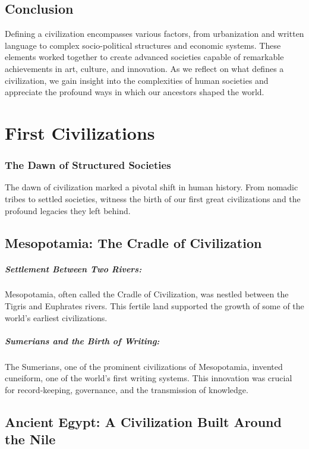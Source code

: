 \documentclass[a4paper,12pt]{book}
\begin{document}
\section*{Conclusion}

Defining a civilization encompasses various factors, from urbanization and written language to complex socio-political structures and economic systems. These elements worked together to create advanced societies capable of remarkable achievements in art, culture, and innovation. As we reflect on what defines a civilization, we gain insight into the complexities of human societies and appreciate the profound ways in which our ancestors shaped the world.

\chapter{First Civilizations}
\subsection*{The Dawn of Structured Societies}
The dawn of civilization marked a pivotal shift in human history. From nomadic tribes to settled societies, witness the birth of our first great civilizations and the profound legacies they left behind.

\section*{Mesopotamia: The Cradle of Civilization}

\paragraph{Settlement Between Two Rivers:}
Mesopotamia, often called the Cradle of Civilization, was nestled between the Tigris and Euphrates rivers. This fertile land supported the growth of some of the world's earliest civilizations.

\paragraph{Sumerians and the Birth of Writing:}
The Sumerians, one of the prominent civilizations of Mesopotamia, invented cuneiform, one of the world's first writing systems. This innovation was crucial for record-keeping, governance, and the transmission of knowledge.

\section*{Ancient Egypt: A Civilization Built Around the Nile}
\end{document}

